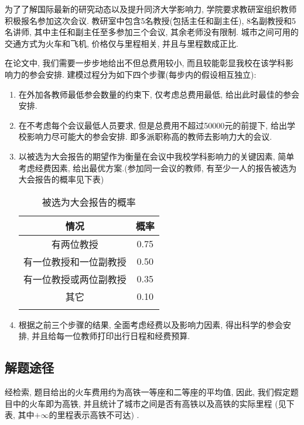     为了了解国际最新的研究动态以及提升同济大学影响力,
    学院要求教研室组织教师积极报名参加这次会议.
    教研室中包含5名教授(包括主任和副主任), 8名副教授和5名讲师,
    其中主任和副主任至多参加三个会议, 其余老师没有限制.
    城市之间可用的交通方式为火车和飞机, 价格仅与里程相关, 并且与里程数成正比.
    
    在论文中, 我们需要一步步地给出不但总费用较小, 而且较能彰显我校在该学科影响力的参会安排.
    建模过程分为如下四个步骤(每步内的假设相互独立):
    \begin{enumerate}
        \item 在外加各教师最低参会数量的约束下, 仅考虑总费用最低, 给出此时最佳的参会安排.
        \item 在不考虑每个会议最低人员要求, 但是总费用不超过50000元的前提下,
                给出学校影响力尽可能大的参会安排.
                即多派职称高的教师去影响力大的会议.
        \item 以被选为大会报告的期望作为衡量在会议中我校学科影响力的关键因素, 简单考虑经费因素,
                给出最优方案.(参加同一会议的教师, 有至少一人的报告被选为大会报告的概率见下表)
            \begin{table}[htb]\footnotesize
                \begin{center}
                    \caption{被选为大会报告的概率}
                    \begin{tabular}{cc}
                        \Xhline{1.2pt}
                        情况 & 概率\\
                        \hline
                        有两位教授 & 0.75\\
                        有一位教授和一位副教授 & 0.50\\
                        有一位教授或两位副教授 & 0.35\\
                        其它 & 0.10\\
                        \Xhline{1.2pt}
                    \end{tabular}
                \end{center}
            \end{table}
        \item 根据之前三个步骤的结果, 全面考虑经费以及影响力因素, 得出科学的参会安排,
                并且给每一位教师打印出行日程和经费预算.
    \end{enumerate}

\subsection{解题途径}
    经检索, 题目给出的火车费用约为高铁一等座和二等座的平均值,
    因此, 我们假定题目中的火车即为高铁,
    并且统计了城市之间是否有高铁以及高铁的实际里程
    (见下表, 其中$+\infty$的里程表示高铁不可达) \citep{Huochepiao}.
    
